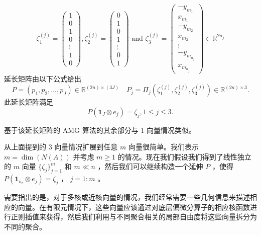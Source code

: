 \documentclass[12pt]{acta_2011xz}
\begin{document}
   $$
\zeta_1^{(j)}=
\begin{pmatrix}
  1 \\ 
0 \\ 
  1 \\ 
0 \\ 
\vdots \\ 
1 \\ 
0
\end{pmatrix}, 
\zeta_2^{(j)}=
\begin{pmatrix}
0 \\ 
1 \\ 
0 \\ 
1 \\ 
\vdots \\ 
0 \\ 
1
\end{pmatrix} \mbox{ and }
\zeta_3^{(j)}=
\begin{pmatrix}
-y_{m_1} \\ 
x_{m_1} \\ 
-y_{m_2} \\ 
x_{m_2} \\ 
\vdots \\ 
-y_{m_{n_j}} \\ 
x_{m_{n_j}}
\end{pmatrix}\in \mathbb R^{2n_j}
$$    延长矩阵由以下公式给出
   $$
P=(p_1, p_2, \ldots, p_J)\in \mathbb R^{(2n)\times(3J)}\quad
P_j=\Pi_j(\zeta^{(j)}_1,\zeta^{(j)}_2,\zeta^{(j)}_3)\in\mathbb
R^{(2n)\times 3}.
$$    此延长矩阵满足
   \begin{equation}
  \label{P1=1}
P (\boldsymbol{1}_{J}\otimes e_j )=\zeta_j, 1\le j\le 3.  
\end{equation}     

基于该延长矩阵的 AMG 算法的其余部分与    $1$    向量情况类似。  

从上面提到的 3 向量情况扩展到任意
   $m$    向量很简单。我们表示    $m=\dim (N(A))$    并考虑    $m\ge 1$    的情况。现在我们假设我们得到了线性独立的    $m$    向量
   $ \{ \zeta_j \} _{j=1}^m$    和    $m\ll n$   ，然后我们可以继续构造一个延伸    $P$    ，使得
   $P(\bm{1}_{n_c}\otimes e_j) = \zeta_j$    ，    $j=1:m$    。  

需要指出的是，对于多核或近核向量的情况，我们经常需要一些几何信息来描述相应的向量。在有限元情况下，这些向量应该通过对底层偏微分算子的相应核函数进行正则插值来获得，然后我们利用与不同聚合相关的局部自由度将这些向量拆分为不同的聚合。  
\end{document}
